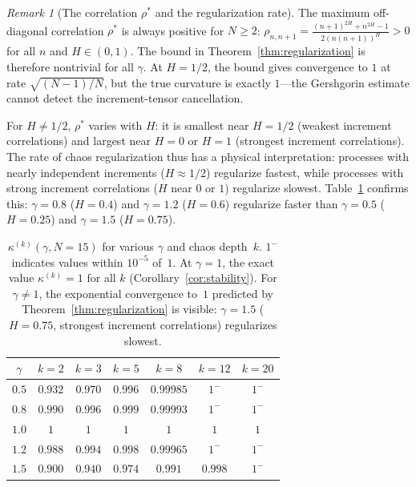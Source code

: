 \documentclass[11pt,a4paper]{article}
\theoremstyle{plain}
\theoremstyle{definition}
\theoremstyle{remark}
\newtheorem{remark}[theorem]{Remark}
\begin{document}
\begin{remark}[The correlation $\rho^*$
and the regularization rate]
\label{rem:rhostar}
The maximum off-diagonal correlation $\rho^*$ is always
positive for $N \geq 2$:
$\rho_{n,n+1} = \frac{(n+1)^{2H} + n^{2H} - 1}
{2(n(n+1))^H} > 0$ for all $n$ and $H \in (0,1)$.
The bound in Theorem~\ref{thm:regularization} is
therefore nontrivial for all $\gamma$.
At $H = 1/2$, the bound gives convergence to $1$
at rate $\sqrt{(N{-}1)/N}$, but the true curvature
is exactly $1$---the Gershgorin estimate cannot
detect the increment-tensor cancellation.

For $H \neq 1/2$, $\rho^*$ varies with $H$:
it is smallest near $H = 1/2$ (weakest increment
correlations) and largest near $H = 0$ or $H = 1$
(strongest increment correlations).
The rate of chaos regularization thus has a physical
interpretation: processes with nearly independent
increments ($H \approx 1/2$) regularize fastest, while
processes with strong increment correlations
($H$ near $0$ or $1$) regularize slowest.
Table~\ref{tab:regularization} confirms this:
$\gamma = 0.8$ ($H = 0.4$) and $\gamma = 1.2$
($H = 0.6$) regularize faster than $\gamma = 0.5$
($H = 0.25$) and $\gamma = 1.5$ ($H = 0.75$).
\end{remark}

\begin{table}[ht]
\centering
\begin{tabular}{c|cccccc}
$\gamma$ & $k=2$ & $k=3$ & $k=5$ & $k=8$ & $k=12$ & $k=20$ \\
\hline
$0.5$ & $0.932$ & $0.970$ & $0.996$ & $0.99985$ & $1^-$ & $1^-$ \\
$0.8$ & $0.990$ & $0.996$ & $0.999$ & $0.99993$ & $1^-$ & $1^-$ \\
$1.0$ & $1$ & $1$ & $1$ & $1$ & $1$ & $1$ \\
$1.2$ & $0.988$ & $0.994$ & $0.998$ & $0.99965$ & $1^-$ & $1^-$ \\
$1.5$ & $0.900$ & $0.940$ & $0.974$ & $0.991$ & $0.998$ & $1^-$ \\
\end{tabular}
\caption{$\kappa^{(k)}(\gamma, N{=}15)$ for various $\gamma$
and chaos depth~$k$.
$1^-$ indicates values within $10^{-5}$ of~$1$.
At $\gamma = 1$, the exact value $\kappa^{(k)} = 1$
for all $k$ (Corollary~\textup{\ref{cor:stability}}).
For $\gamma \neq 1$, the exponential convergence to~$1$
predicted by Theorem~\textup{\ref{thm:regularization}}
is visible: $\gamma = 1.5$ ($H = 0.75$, strongest
increment correlations) regularizes slowest.}
\label{tab:regularization}
\end{table}
\end{document}
